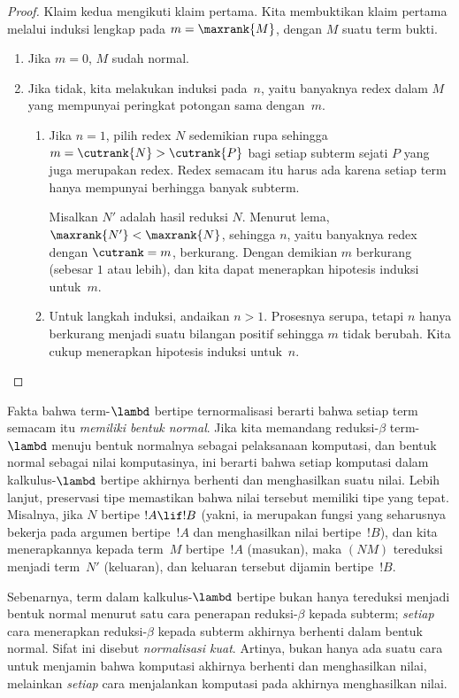 \documentclass[../../../include/open-logic-section]{subfiles}
\begin{document}
\begin{proof}
  Klaim kedua mengikuti klaim pertama. Kita membuktikan klaim pertama
  melalui induksi lengkap pada $m=\maxrank{M}$, dengan $M$ suatu term
  bukti.
  \begin{enumerate}

  \item Jika $m=0$, $M$ sudah normal.
  \item
    Jika tidak, kita melakukan induksi pada~$n$, yaitu banyaknya redex
    dalam $M$ yang mempunyai peringkat potongan sama dengan~$m$.
    \begin{enumerate}
    \item Jika $n=1$, pilih redex $N$ sedemikian rupa sehingga
      $m = \cutrank{N} > \cutrank{P}$ bagi setiap subterm sejati $P$
      yang juga merupakan redex. Redex semacam itu harus ada karena
      setiap term hanya mempunyai berhingga banyak subterm.

      Misalkan $N'$ adalah hasil reduksi $N$. Menurut lema,
      $\maxrank{N'} < \maxrank{N}$, sehingga $n$, yaitu banyaknya redex
      dengan $\cutrank=m$, berkurang. Dengan demikian $m$ berkurang
      (sebesar $1$ atau lebih), dan kita dapat menerapkan hipotesis
      induksi untuk~$m$.
    \item Untuk langkah induksi, andaikan $n>1$. Prosesnya serupa, tetapi
      $n$ hanya berkurang menjadi suatu bilangan positif sehingga $m$
      tidak berubah. Kita cukup menerapkan hipotesis induksi untuk~$n$.
    \end{enumerate}
  \end{enumerate}
\end{proof}

Fakta bahwa term-$\lambd$ bertipe ternormalisasi berarti bahwa setiap
term semacam itu \emph{memiliki bentuk normal}. Jika kita memandang
reduksi-$\beta$ term-$\lambd$ menuju bentuk normalnya sebagai pelaksanaan
komputasi, dan bentuk normal sebagai nilai komputasinya, ini berarti
bahwa setiap komputasi dalam kalkulus-$\lambd$ bertipe akhirnya berhenti
dan menghasilkan suatu nilai. Lebih lanjut, preservasi tipe memastikan
bahwa nilai tersebut memiliki tipe yang tepat. Misalnya, jika $N$
bertipe $!A \lif !B$ (yakni, ia merupakan fungsi yang seharusnya bekerja
pada argumen bertipe~$!A$ dan menghasilkan nilai bertipe~$!B$), dan kita
menerapkannya kepada term~$M$ bertipe~$!A$ (masukan), maka $(NM)$
tereduksi menjadi term~$N'$ (keluaran), dan keluaran tersebut dijamin
bertipe~$!B$.

Sebenarnya, term dalam kalkulus-$\lambd$ bertipe bukan hanya tereduksi
menjadi bentuk normal menurut satu cara penerapan reduksi-$\beta$ kepada
subterm; \emph{setiap} cara menerapkan reduksi-$\beta$ kepada subterm
akhirnya berhenti dalam bentuk normal. Sifat ini disebut
\emph{normalisasi kuat}. Artinya, bukan hanya ada suatu cara untuk
menjamin bahwa komputasi akhirnya berhenti dan menghasilkan nilai,
melainkan \emph{setiap} cara menjalankan komputasi pada akhirnya
menghasilkan nilai.
\end{document}

